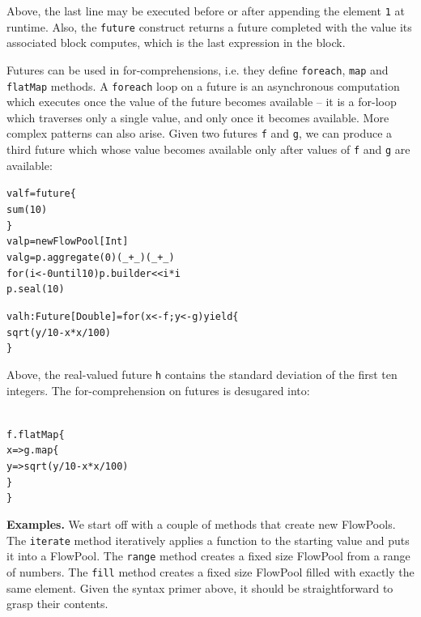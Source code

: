 \documentclass[runningheads,a4paper]{llncs}
\begin{document}
Above, the last line may be executed before or after appending the element
\verb=1= at runtime.
Also, the \verb=future= construct returns a future completed with the value
its associated block computes, which is the last expression in the block.

Futures can be used in for-comprehensions, i.e. they define \verb=foreach=,
\verb=map= and \verb=flatMap= methods.
A \verb=foreach= loop on a future is an asynchronous computation which executes
once the value of the future becomes available -- it is a for-loop which traverses
only a single value, and only once it becomes available.
More complex patterns can also arise.
Given two futures \verb=f= and \verb=g=, we can produce a third future which
whose value becomes available only after values of \verb=f= and \verb=g=
are available:

\begin{minipage}[b]{3.75 cm}
\begin{alltt}
{\scriptsize
val f = future \{
  sum(10)
\}
val p = new FlowPool[Int]
val g = p.aggregate(0)(_ + _)(_ + _)
for (i <- 0 until 10) p.builder << i * i
p.seal(10)

val h: Future[Double] = for (x <- f; y <- g) yield \{
  sqrt(y / 10 - x * x / 100)
\}
}
\end{alltt}
\end{minipage}

Above, the real-valued future \verb=h= contains the standard
deviation of the first ten integers.
The for-comprehension on futures is desugared into:

\begin{minipage}[b]{3.75 cm}
\begin{alltt}
{\scriptsize
f.flatMap \{
  x => g.map \{
    y => sqrt(y / 10 - x * x / 100)
  \}
\}
}
\end{alltt}
\end{minipage}


\textbf{Examples.}
We start off with a couple of methods that create new FlowPools.
The \verb=iterate= method iteratively applies a function to the starting
value and puts it into a FlowPool.
The \verb=range= method creates a fixed size FlowPool from a range of numbers.
The \verb=fill= method creates a fixed size FlowPool filled with exactly
the same element.
Given the syntax primer above, it should be straightforward to grasp
their contents.
\end{document}
